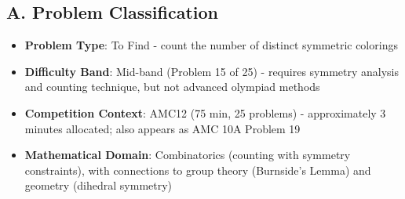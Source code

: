 \documentclass[]{article}
\begin{document}
\begin{problemconfigbox}
\subsection*{A. Problem Classification}
\begin{itemize}[leftmargin=*]
    \item \textbf{Problem Type}: To Find - count the number of distinct symmetric colorings
    \item \textbf{Difficulty Band}: Mid-band (Problem 15 of 25) - requires symmetry analysis and counting technique, but not advanced olympiad methods
    \item \textbf{Competition Context}: AMC12 (75 min, 25 problems) - approximately 3 minutes allocated; also appears as AMC 10A Problem 19
    \item \textbf{Mathematical Domain}: Combinatorics (counting with symmetry constraints), with connections to group theory (Burnside's Lemma) and geometry (dihedral symmetry)
\end{itemize}


\end{problemconfigbox}
\end{document}
